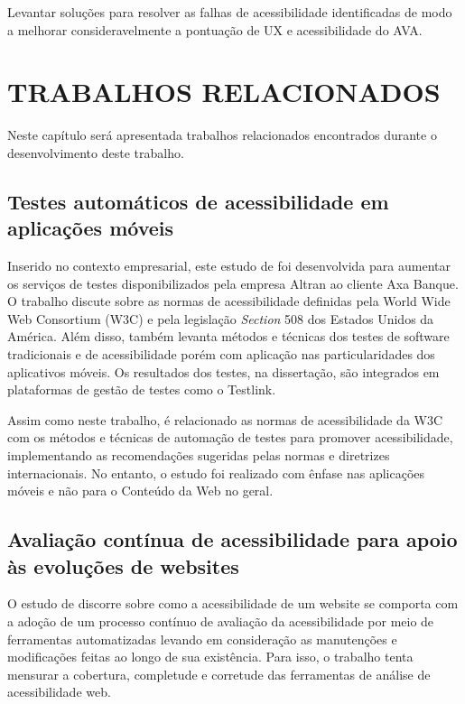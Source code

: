 \documentclass[
	12pt,				%
	openright,			%
	oneside,			%
	a4paper,			%
	chapter=TITLE,		%
	section=TITLE,		%
	subsection=TITLE,	%
	subsubsection=TITLE,%
	english,			%
	brazil				%
	]{abntex2}
\theoremstyle{definition}
\begin{document}
Levantar soluções para resolver as falhas de acessibilidade identificadas de modo a melhorar consideravelmente a pontuação de UX e acessibilidade do AVA.
    


\chapter{TRABALHOS RELACIONADOS}

Neste capítulo será apresentada trabalhos relacionados encontrados durante o desenvolvimento deste trabalho.

\section{Testes automáticos de acessibilidade em aplicações móveis} 

Inserido no contexto empresarial, este estudo de \cite{chantre2015testes} foi desenvolvida para aumentar os serviços de testes disponibilizados pela empresa Altran ao cliente Axa Banque. O trabalho discute sobre as normas de acessibilidade definidas pela World Wide Web Consortium (W3C) e pela legislação \textit{Section} 508 dos Estados Unidos da América. Além disso, também levanta métodos e técnicas dos testes de software tradicionais e de acessibilidade porém com aplicação nas particularidades dos aplicativos móveis. Os resultados dos testes, na dissertação, são integrados em plataformas de gestão de testes como o Testlink.

Assim como neste trabalho, é relacionado as normas de acessibilidade da W3C com os métodos e técnicas de automação de testes para promover acessibilidade, implementando as recomendações sugeridas pelas normas e diretrizes internacionais. No entanto, o estudo foi realizado com ênfase nas aplicações móveis e não para o Conteúdo da Web no geral.

\section{Avaliação contínua de acessibilidade para apoio às evoluções de websites} 

O estudo de \cite{silva2017avaliaccao} discorre sobre como a acessibilidade de um website se comporta com a adoção de um processo contínuo de avaliação da acessibilidade por meio de ferramentas automatizadas levando em consideração as manutenções e modificações feitas ao longo de sua existência. Para isso, o trabalho tenta mensurar a cobertura, completude e corretude das ferramentas de análise de acessibilidade web.
\end{document}
